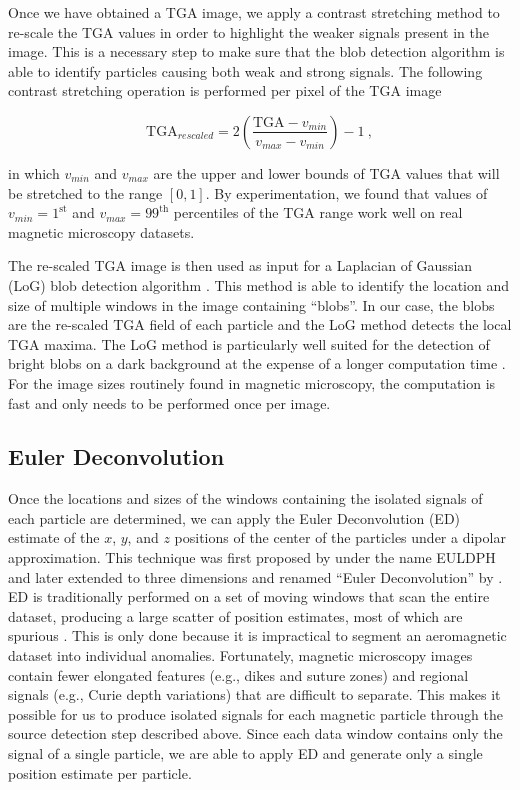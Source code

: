 Once we have obtained a TGA image, we apply a contrast stretching method to
re-scale the TGA values in order to highlight the weaker signals present in the
image. This is a necessary step to make sure that the blob detection algorithm
is able to identify particles causing both weak and strong signals. The
following contrast stretching operation is performed per pixel of the TGA image

\begin{equation}
\text{TGA}_{rescaled} =
2\left(\dfrac{\text{TGA} - v_{min}}{v_{max} - v_{min}}\right) - 1
\ ,
\end{equation}

\noindent
in which $v_{min}$ and $v_{max}$ are the upper and lower bounds of TGA values
that will be stretched to the range $[0, 1]$. By experimentation, we found
that values of $v_{min} = 1^\text{st}$ and $v_{max} = 99^\text{th}$
percentiles of the TGA range work well on real magnetic microscopy datasets.

The re-scaled TGA image is then used as input for a Laplacian of Gaussian (LoG)
blob detection algorithm \citep{Kong2013}. This method is able to identify the
location and size of multiple windows in the image containing ``blobs''. In our
case, the blobs are the re-scaled TGA field of each particle and the LoG method
detects the local TGA maxima. The LoG method is particularly well suited for
the detection of bright blobs on a dark background at the expense of a longer
computation time \citep{Han2016}. For the image sizes routinely found in
magnetic microscopy, the computation is fast and only needs to be performed
once per image.

\subsection{Euler Deconvolution}

Once the locations and sizes of the windows containing the isolated signals of
each particle are determined, we can apply the Euler Deconvolution (ED)
estimate of the $x$, $y$, and $z$ positions of the center of the particles
under a dipolar approximation. This technique was first proposed by
\citet{Thompson1982} under the name EULDPH and later extended to three
dimensions and renamed ``Euler Deconvolution'' by \citet{Reid1990}. ED is
traditionally performed on a set of moving windows that scan the entire
dataset, producing a large scatter of position estimates, most of which are
spurious \citep{Silva20033D}. This is only done because it is impractical to
segment an aeromagnetic dataset into individual anomalies. Fortunately,
magnetic microscopy images contain fewer elongated features (e.g., dikes and
suture zones) and regional signals (e.g., Curie depth variations) that are
difficult to separate. This makes it possible for us to produce isolated
signals for each magnetic particle through the source detection step described
above. Since each data window contains only the signal of a single particle, we
are able to apply ED and generate only a single position estimate per particle.

